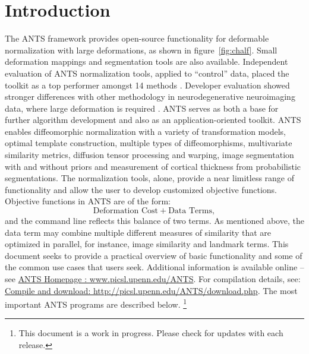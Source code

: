 \documentclass{InsightArticle}
\begin{document}
\section{Introduction}
The ANTS framework provides open-source functionality for deformable
normalization with large deformations, as shown in
figure~\ref{fig:chalf}.  Small deformation mappings and segmentation 
tools are also available. 
Independent evaluation of ANTS normalization tools, 
applied to ``control'' data, 
placed the toolkit as a top performer amongst 14
methods \cite{Klein2009}.  Developer evaluation showed stronger differences 
with other methodology in neurodegenerative neuroimaging data, 
where large deformation is required \cite{Avants2008b}. 
ANTS serves as both a base for further
algorithm development and also as an application-oriented toolkit.
ANTS enables diffeomorphic normalization with a variety of
transformation models, optimal template construction, multiple types
of diffeomorphisms, multivariate similarity metrics, diffusion tensor
processing and warping, image segmentation with and without priors and
measurement of cortical thickness from probabilistic segmentations.
The normalization tools, alone, provide a near limitless range of
functionality and allow the user to develop customized objective
functions.  Objective functions in ANTS are of the form: $$
\text{Deformation Cost} + \text{Data Terms},$$ and the command
line reflects this balance of two terms.  As mentioned above, the
data term may combine multiple different measures of
similarity that are optimized in parallel, for instance, image similarity 
and landmark terms.  This document seeks to
provide a practical overview of basic functionality and some of the common use cases that
users seek.
Additional information is available online -- see 
\href{www.picsl.upenn.edu/ANTS}{ANTS Homepage : www.picsl.upenn.edu/ANTS}.
For compilation details, see: \href{http://picsl.upenn.edu/ANTS/download.php}{Compile and download: http://picsl.upenn.edu/ANTS/download.php}.
The most important ANTS programs are described below. 
\footnote{This document is a work in progress. Please check for updates with each release.}
\end{document}

